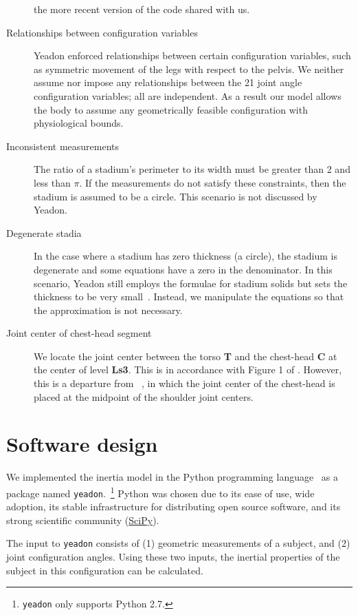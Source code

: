 \documentclass[10pt,a4paper,twocolumn]{article}
\begin{document}
\begin{description}
      the more recent version of the code shared with us.
    \item[Relationships between configuration variables] Yeadon enforced
      relationships between certain configuration variables, such as symmetric
      movement of the legs with respect to the pelvis. We neither assume nor
      impose any relationships between the 21 joint angle configuration
      variables; all are independent. As a result our model allows the body to
      assume any geometrically feasible configuration with physiological
      bounds.
    \item[Inconsistent measurements] The ratio of a stadium's perimeter to its
      width must be greater than 2 and less than $\pi$. If the measurements do
      not satisfy these constraints, then the stadium is assumed to be a
      circle. This scenario is not discussed by Yeadon.
    \item[Degenerate stadia] In the case where a stadium has zero thickness (a
      circle), the stadium is degenerate and some equations have a zero in the
      denominator. In this scenario, Yeadon still employs the formulae for
      stadium solids but sets the thickness to be very
      small~\cite{Yeadon1990f}.  Instead, we manipulate the equations so that
      the approximation is not necessary.
    \item[Joint center of chest-head segment] We locate the joint center
      between the torso \textbf{T} and the chest-head \textbf{C} at the center
      of level \textbf{Ls3}. This is in accordance with Figure 1 of
      \cite{Yeadon1990e}. However, this is a departure from
      ~\cite{Yeadon1984a}, in which the joint center of the chest-head is
      placed at the midpoint of the shoulder joint centers.
\end{description}

\section*{Software design}

We implemented the inertia model in the Python programming
language~\cite{Python2014} as a package named
\verb+yeadon+.~\cprotect\footnote{\verb+yeadon+ only supports Python 2.7.}
Python was chosen due to its ease of use, wide adoption, its stable
infrastructure for distributing open source software, and its strong scientific
community (\href{http://www.scipy.org}{SciPy}).

The input to \verb+yeadon+ consists of (1) geometric measurements of a subject,
and (2) joint configuration angles. Using these two inputs, the inertial
properties of the subject in this configuration can be calculated.
\end{document}
